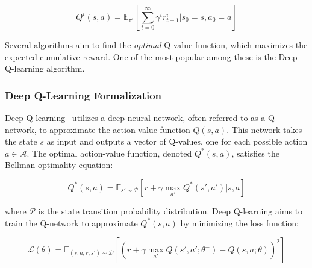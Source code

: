\documentclass[sigconf]{acmart}
\begin{document}
\[ Q^i(s, a) = \mathbb{E}_{\pi^i} \left[ \sum_{t=0}^{\infty} \gamma^t r^i_{t+1} | s_0 = s, a_0 = a \right] \]



Several algorithms aim to find the \emph{optimal} Q-value function, which maximizes the expected cumulative reward. 
%
One of the most popular among these is the Deep Q-learning algorithm.
\subsubsection{Deep Q-Learning Formalization}
Deep Q-learning~\cite{DBLP:conf/l4dc/FanWXY20} utilizes a deep neural network, 
often referred to as a Q-network, to approximate the action-value function $Q(s, a)$. 
This network takes the state $s$ as input and outputs a vector of Q-values, one for each possible action $a \in \mathcal{A}$.  
The optimal action-value function, denoted $Q^*(s, a)$, satisfies the Bellman optimality equation:

\[ Q^*(s, a) = \mathbb{E}_{s' \sim \mathcal{P}} \left[ r + \gamma \max_{a'} Q^*(s', a') | s, a \right] \]

where $\mathcal{P}$ is the state transition probability distribution.  
Deep Q-learning aims to train the Q-network to approximate $Q^*(s, a)$ by minimizing the loss function:

\[ \mathcal{L}(\theta) = \mathbb{E}_{(s, a, r, s') \sim \mathcal{D}} \left[ \left( r + \gamma \max_{a'} Q(s', a'; \theta^-) - Q(s, a; \theta) \right)^2 \right] \]
\end{document}
